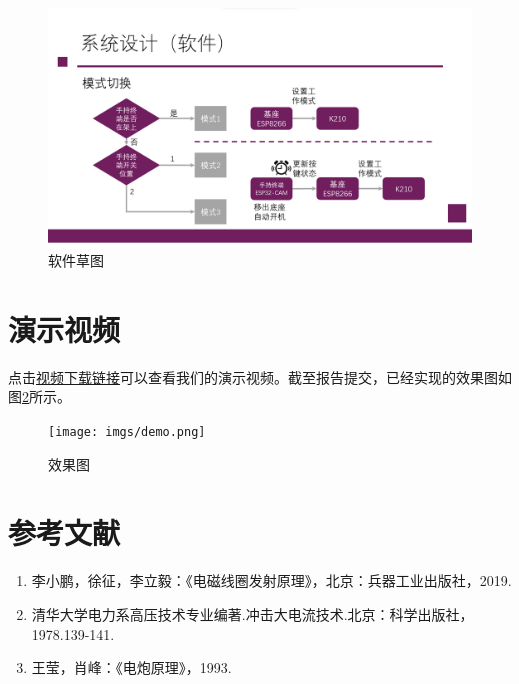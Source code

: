 \documentclass{article}
\begin{document}
\begin{figure}
\begin{minipage}[b]{.45\linewidth}
\end{minipage}
\begin{minipage}[b]{.45\linewidth}
    \includegraphics[width=\linewidth]{imgs/soft4.png}
\end{minipage}
\caption{软件草图}
\label{soft}
\end{figure}
\appendix
\section{演示视频}
点击\href{https://cloud.tsinghua.edu.cn/f/abc058fe22bd465c998f/}{视频下载链接}可以查看我们的演示视频。截至报告提交，已经实现的效果图如图\ref{demo}所示。
\begin{figure}
    \centering
    \begin{minipage}[b]{0.85\linewidth}
        \texttt{[image: imgs/demo.png]}
    \end{minipage}
    \caption{效果图}
    \label{demo}
\end{figure}
\section{参考文献}
\begin{enumerate}
    \item 李小鹏，徐征，李立毅：《电磁线圈发射原理》，北京：兵器工业出版社，2019.
    \item 清华大学电力系高压技术专业编著.冲击大电流技术.北京：科学出版社，1978.139-141.
    \item 王莹，肖峰：《电炮原理》，1993.
\end{enumerate}
\end{document}
